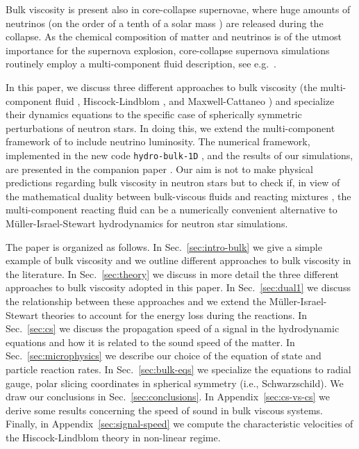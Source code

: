 \documentclass[aps,prd,twocolumn,a4paper,floatfix,nofootbib,superscriptaddress,nofootinbib]{revtex4}
\begin{document}
Bulk viscosity is present also in core-collapse supernovae, where huge amounts
of neutrinos (on the order of a tenth of a solar mass \cite{Burrows88}) are
released during the collapse.  As the chemical composition of matter and
neutrinos is of the utmost importance for the supernova explosion,
core-collapse supernova simulations routinely employ a multi-component fluid
description, see e.g.~\citet{OConnor10}.

In this paper, we discuss three different approaches to bulk viscosity (the
multi-component fluid \citep{carter1991, Gavassino21bulk}, Hiscock-Lindblom
\citep{Hiscock1983}, and Maxwell-Cattaneo \cite{Zakari93}) and specialize their dynamics
equations to the specific case of spherically symmetric perturbations of
neutron stars. In doing this, we extend the multi-component framework of
\citet{Gavassino21bulk} to include neutrino luminosity. The numerical
framework, implemented in the new code \texttt{hydro-bulk-1D} \cite{Camelio22code}, and the results
of our simulations, are presented in the companion paper \citep{Camelio22b}.
Our aim is not to make physical predictions regarding bulk viscosity in neutron stars but
to check if, in view of the mathematical duality between bulk-viscous fluids and reacting mixtures \citep{Gavassino21bulk},
the multi-component reacting fluid can be a numerically convenient alternative
to M\"uller-Israel-Stewart hydrodynamics for neutron star simulations.

The paper is organized as follows.
%
In Sec.~\ref{sec:intro-bulk} we give a simple example of bulk viscosity and we
outline different approaches to bulk viscosity in the literature.
%
In Sec.~\ref{sec:theory} we discuss in more detail the three different
approaches to bulk viscosity adopted in this paper.
%
In Sec.~\ref{sec:dual1} we discuss the relationship between these approaches and we extend the
M\"uller-Israel-Stewart theories to account for the energy loss during the
reactions.
%
In Sec.~\ref{sec:cs} we discuss the propagation speed of a signal in the
hydrodynamic equations and how it is related to the sound speed of the matter.
%
In Sec.~\ref{sec:microphysics} we describe our choice of the equation of state
and particle reaction rates.
%
In Sec.~\ref{sec:bulk-eqs} we specialize the equations to radial gauge,
polar slicing coordinates in spherical symmetry (i.e., Schwarzschild).
%
We draw our conclusions in Sec.~\ref{sec:conclusions}.
%
In Appendix~\ref{sec:cs-vs-cs} we derive some results
concerning the speed of sound in bulk viscous systems.
%
Finally, in Appendix~\ref{sec:signal-speed} we compute the characteristic
velocities of the Hiscock-Lindblom theory in non-linear regime.
\end{document}
